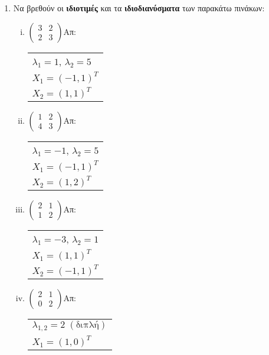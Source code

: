 \documentclass[a4paper,table]{report}
\begin{document}
\begin{center}
  \minibox{\large\bfseries \textcolor{Col1}{Ασκήσεις στις Ιδιοτιμές - Ιδιοδιανύσματα
  Πίνακα}}
\end{center}

\vspace{\baselineskip}

\begin{enumerate}

\item Να βρεθούν οι \textbf{ιδιοτιμές} και τα \textbf{ιδιοδιανύσματα} των παρακάτω 
  πινάκων:

\begin{enumerate}[i)]

\item $\begin{pmatrix}
3 & 2 \\
2 & 3
\end{pmatrix}$\hfill Απ: \begin{tabular}{l}
$\lambda_1=1$, $\lambda_2=5$ \\
$X_1=(-1,1)^T$ \\
$X_2=(1,1)^T$
\end{tabular}

\item $\begin{pmatrix}
1 & 2 \\
4 & 3
\end{pmatrix}$\hfill Απ: \begin{tabular}{l}
$\lambda_1=-1$, $\lambda_2=5$ \\
$X_1=(-1,1)^T$ \\
$X_2=(1,2)^T$
\end{tabular}

\item $\begin{pmatrix}
2 & 1 \\
1 & 2
\end{pmatrix}$\hfill Απ: \begin{tabular}{l}
$\lambda_1=-3$, $\lambda_2=1$ \\
$X_1=(1,1)^T$ \\
$X_2=(-1,1)^T$
\end{tabular}

\item $\begin{pmatrix}
2 & 1 \\
0 & 2
\end{pmatrix}$\hfill Απ: \begin{tabular}{l}
$\lambda_{1,2}=2 \; (\text{διπλή})$ \\
$X_1=(1,0)^T$ \\
\end{tabular}


\end{enumerate}
\end{enumerate}
\end{document}
